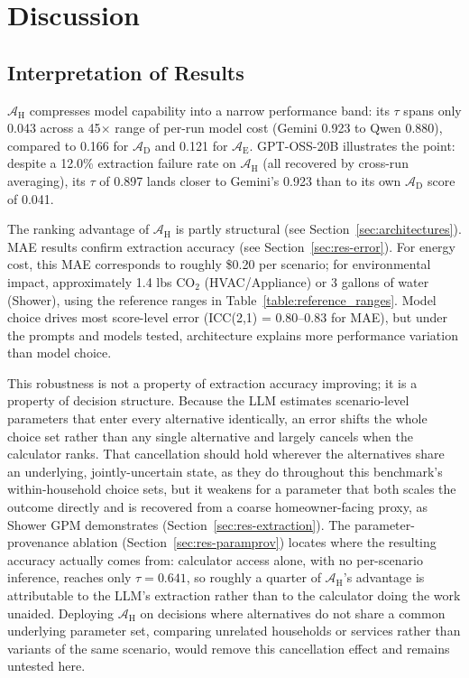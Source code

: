 \documentclass[final,3p,times]{elsarticle}
\begin{document}
\FloatBarrier
\section{Discussion}
\label{sec:discussion}

\subsection{Interpretation of Results}
\label{sec:interpretation}

$\mathcal{A}_{\text{H}}$ compresses model capability into a narrow performance band: its $\tau$ spans only 0.043 across a 45$\times$ range of per-run model cost (Gemini 0.923 to Qwen 0.880), compared to 0.166 for $\mathcal{A}_{\text{D}}$ and 0.121 for $\mathcal{A}_{\text{E}}$. GPT-OSS-20B illustrates the point: despite a 12.0\% extraction failure rate on $\mathcal{A}_{\text{H}}$ (all recovered by cross-run averaging), its $\tau$ of 0.897 lands closer to Gemini's 0.923 than to its own $\mathcal{A}_{\text{D}}$ score of 0.041.

The ranking advantage of $\mathcal{A}_{\text{H}}$ is partly structural (see Section~\ref{sec:architectures}). MAE results confirm extraction accuracy (see Section~\ref{sec:res-error}). For energy cost, this MAE corresponds to roughly \$0.20 per scenario; for environmental impact, approximately 1.4 lbs CO$_2$ (HVAC/Appliance) or 3 gallons of water (Shower), using the reference ranges in Table~\ref{table:reference_ranges}. Model choice drives most score-level error (ICC(2,1) = 0.80--0.83 for MAE), but under the prompts and models tested, architecture explains more performance variation than model choice.

This robustness is not a property of extraction accuracy improving; it is a property of decision structure. Because the LLM estimates scenario-level parameters that enter every alternative identically, an error shifts the whole choice set rather than any single alternative and largely cancels when the calculator ranks. That cancellation should hold wherever the alternatives share an underlying, jointly-uncertain state, as they do throughout this benchmark's within-household choice sets, but it weakens for a parameter that both scales the outcome directly and is recovered from a coarse homeowner-facing proxy, as Shower GPM demonstrates (Section~\ref{sec:res-extraction}). The parameter-provenance ablation (Section~\ref{sec:res-paramprov}) locates where the resulting accuracy actually comes from: calculator access alone, with no per-scenario inference, reaches only $\tau = 0.641$, so roughly a quarter of $\mathcal{A}_{\text{H}}$'s advantage is attributable to the LLM's extraction rather than to the calculator doing the work unaided. Deploying $\mathcal{A}_{\text{H}}$ on decisions where alternatives do not share a common underlying parameter set, comparing unrelated households or services rather than variants of the same scenario, would remove this cancellation effect and remains untested here.
\end{document}

